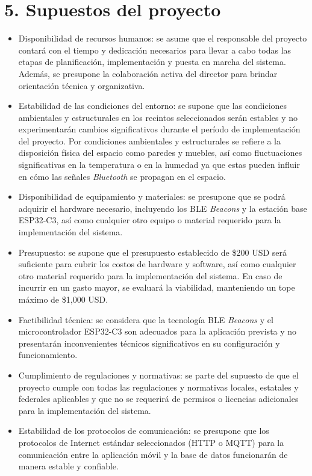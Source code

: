 \documentclass[
11pt, %
]{charter}
\begin{document}
\section{5. Supuestos del proyecto}
\label{sec:supuestos}

\begin{itemize}
	\item Disponibilidad de recursos humanos: se asume que el responsable del proyecto contará con el tiempo y dedicación necesarios para llevar a cabo todas las etapas de planificación, implementación y puesta en marcha del sistema. Además, se presupone la colaboración activa del director para brindar orientación técnica y organizativa.
	\item Estabilidad de las condiciones del entorno: se supone que las condiciones ambientales y estructurales en los recintos seleccionados serán estables y no experimentarán cambios significativos durante el período de implementación del proyecto. Por condiciones ambientales y estructurales se refiere a la disposición física del espacio como paredes y muebles, así como fluctuaciones significativas en la temperatura o en la humedad ya que estas pueden influir en cómo las señales \textit{Bluetooth} se propagan en el espacio.
	\item Disponibilidad de equipamiento y materiales: se presupone que se podrá adquirir el hardware necesario, incluyendo los BLE \textit{Beacons} y la estación base ESP32-C3, así como cualquier otro equipo o material requerido para la implementación del sistema.
	\item Presupuesto: se supone que el presupuesto establecido de {\$200} USD será suficiente para cubrir los costos de hardware y software, así como cualquier otro material requerido para la implementación del sistema. En caso de incurrir en un gasto mayor, se evaluará la viabilidad, manteniendo un tope máximo de {\$1,000} USD.
	\item Factibilidad técnica: se considera que la tecnología BLE \textit{Beacons} y el microcontrolador ESP32-C3 son adecuados para la aplicación prevista y no presentarán inconvenientes técnicos significativos en su configuración y funcionamiento.
	\item Cumplimiento de regulaciones y normativas: se parte del supuesto de que el proyecto cumple con todas las regulaciones y normativas locales, estatales y federales aplicables y que no se requerirá de permisos o licencias adicionales para la implementación del sistema.
	\item Estabilidad de los protocolos de comunicación: se presupone que los protocolos de Internet estándar seleccionados (HTTP o MQTT) para la comunicación entre la aplicación móvil y la base de datos funcionarán de manera estable y confiable.

\end{itemize}
\end{document}
